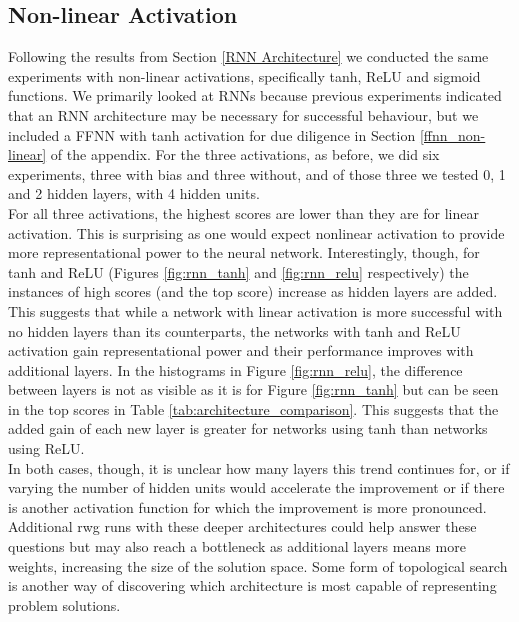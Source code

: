 \documentclass[12pt]{article}
\begin{document}
	
					
\subsection{Non-linear Activation}\label{non-linear}

Following the results from Section \ref{RNN Architecture} we conducted the same experiments with non-linear activations, specifically tanh, ReLU and sigmoid functions. We primarily looked at RNNs because previous experiments indicated that an RNN architecture may be necessary for successful behaviour, but we included a FFNN with tanh activation for due diligence in Section \ref{ffnn_non-linear} of the appendix. For the three activations, as before, we did six experiments, three with bias and three without, and of those three we tested 0, 1 and 2 hidden layers, with 4 hidden units.\\

For all three activations, the highest scores are lower than they are for linear activation. This is surprising as one would expect nonlinear activation to provide more representational power to the neural network. Interestingly, though, for tanh and ReLU (Figures \ref{fig:rnn_tanh} and \ref{fig:rnn_relu} respectively) the instances of high scores (and the top score) increase as hidden layers are added. This suggests that while a network with linear activation is more successful with no hidden layers than its counterparts, the networks with tanh and ReLU activation gain representational power and their performance improves with additional layers. In the histograms in Figure \ref{fig:rnn_relu}, the difference between layers is not as visible as it is for Figure \ref{fig:rnn_tanh} but can be seen in the top scores in Table \ref{tab:architecture_comparison}. This suggests that the added gain of each new layer is greater for networks using tanh than networks using ReLU.\\

In both cases, though, it is unclear how many layers this trend continues for, or if varying the number of hidden units would accelerate the improvement or if there is another activation function for which the improvement is more pronounced. Additional rwg runs with these deeper architectures could help answer these questions but may also reach a bottleneck as additional layers means more weights, increasing the size of the solution space. Some form of topological search \cite{stanley:MIT:2002} is another way of discovering which architecture is most capable of representing problem solutions.\\ 
\end{document}

